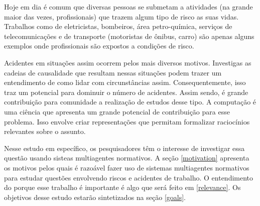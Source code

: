 Hoje em dia é comum que diversas pessoas se submetam a atividades (na grande maior das vezes, profissionais) que trazem algum tipo de risco as suas vidas. Trabalhos como de eletricistas, bombeiros, área petro-química, serviços de telecomunicações e de transporte (motoristas de ônibus, carro) são apenas alguns exemplos onde profissionais são  expostos a condições de risco.

Acidentes em situações assim ocorrem pelos mais diversos motivos. Investigas as cadeias de causalidade que resultam nessas situações podem trazer um entendimento de como lidar com circunstâncias assim. Consequentemente, isso traz um potencial para dominuir o número de acidentes. Assim sendo, é grande contribuição para comunidade a realização de estudos desse tipo. A computação é uma ciência que apresenta um grande potencial de contribuição para esse problema. Isso envolve criar representações que permitam formalizar raciocínios relevantes sobre o assunto.

Nesse estudo em específico, os pesquisadores têm o interesse de investigar essa questão usando sisteas multiagentes normativos. A seção \ref{motivation} apresenta os motivos pelos quais é razoável fazer uso de sistemas multiagentes normativos para estudar questões envolvendo riscos e acidentes de trabalho. O entendimento do porque 
esse trabalho é importante é algo que será feito em \ref{relevance}. Os objetivos desse estudo estarão sintetizados na seção \ref{goals}.
